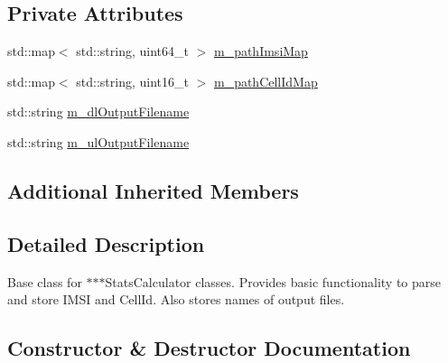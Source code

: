 \subsection*{Private Attributes}
\begin{DoxyCompactItemize}
\item 
std\+::map$<$ std\+::string, uint64\+\_\+t $>$ \hyperlink{classns3_1_1LteStatsCalculator_a46229dd42330bc89b679200b8a9c3c7f}{m\+\_\+path\+Imsi\+Map}
\item 
std\+::map$<$ std\+::string, uint16\+\_\+t $>$ \hyperlink{classns3_1_1LteStatsCalculator_a49a9eed5331eccb0fb9f3a9ca40b711a}{m\+\_\+path\+Cell\+Id\+Map}
\item 
std\+::string \hyperlink{classns3_1_1LteStatsCalculator_a96625d771fe8fbc22aa0e1799c4a4c82}{m\+\_\+dl\+Output\+Filename}
\item 
std\+::string \hyperlink{classns3_1_1LteStatsCalculator_a0dfb9acc5375b2ca0c880dd395adb80e}{m\+\_\+ul\+Output\+Filename}
\end{DoxyCompactItemize}
\subsection*{Additional Inherited Members}


\subsection{Detailed Description}
Base class for $\ast$$\ast$$\ast$\+Stats\+Calculator classes. Provides basic functionality to parse and store I\+M\+SI and Cell\+Id. Also stores names of output files. 

\subsection{Constructor \& Destructor Documentation}
